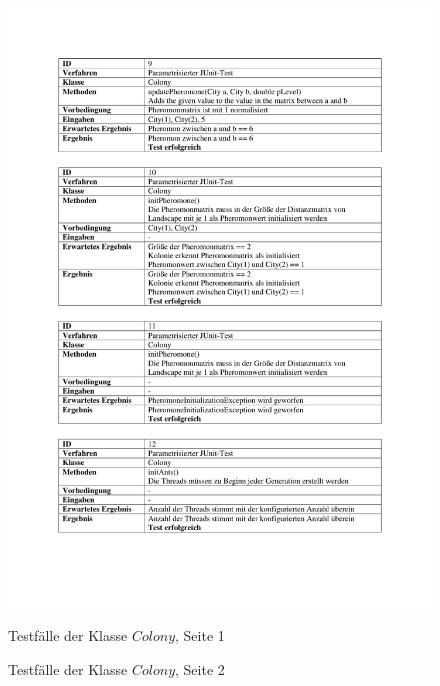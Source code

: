 \begin{appendices}
	\begin{figure}[h]
		\centering
		\caption{Testfälle der Klasse $Colony$, Seite 1}
		\includegraphics[width=\linewidth]{images/Testfaelle_Colony_Seite_1.pdf}
		\label{testColony1}
	\end{figure}
	\begin{figure}[h]
		\centering
		\caption{Testfälle der Klasse $Colony$, Seite 2}

\end{figure}
\end{appendices}
